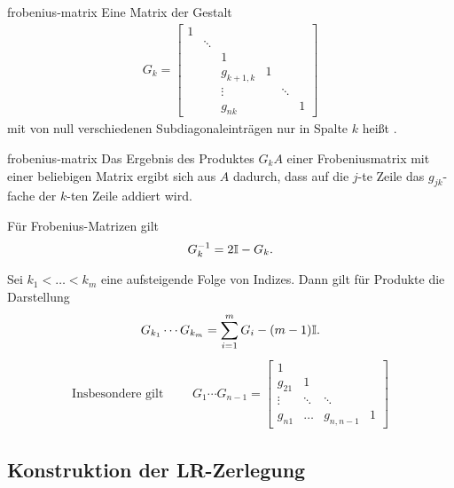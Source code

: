 \begin{Definition}{frobenius-matrix}
  Eine Matrix der Gestalt
  \begin{gather}
    G_k=\begin{bmatrix}
      1 & & & & & \\
      &\ddots & & & & \\
      &   & 1& & &\\
      &   & g_{k+1,k}&1 & &\\
      &   & \vdots& &\ddots &\\
      &   & g_{nk}& & &1
    \end{bmatrix}
  \end{gather}
  mit von null verschiedenen Subdiagonaleinträgen nur in Spalte $k$
  heißt .
\end{Definition}

\begin{Lemma}{frobenius-matrix}
  Das Ergebnis des Produktes $G_kA$ einer Frobeniusmatrix mit einer
  beliebigen Matrix ergibt sich aus $A$ dadurch, dass auf die $j$-te
  Zeile das $g_{jk}$-fache der $k$-ten Zeile addiert wird.

  Für Frobenius-Matrizen gilt
  \begin{gather}
    G_k^{-1} = 2\mathbb I-G_k.
  \end{gather}
  
  Sei $k_1<\dots<k_m$ eine aufsteigende Folge von Indizes. Dann gilt für Produkte die Darstellung
  \begin{gather}
    G_{k_1}\cdots G_{k_m} = \sum_{i=1}^m G_i - (m-1) \mathbb I.
  \end{gather}
  \begin{gather}
    \text{Insbesondere gilt }\qquad
    G_1\cdots G_{n-1} =
    \begin{bmatrix}
      1\\
      g_{21} & 1 \\
      \vdots & \ddots & \ddots \\
      g_{n1}  & \dots & g_{n,n-1} & 1
    \end{bmatrix}
  \end{gather}
\end{Lemma}

\subsection{Konstruktion der LR-Zerlegung}

